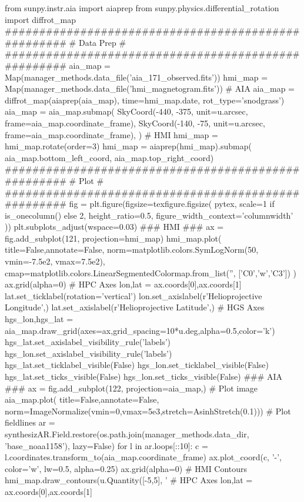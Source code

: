 \begin{pycode}
from sunpy.instr.aia import aiaprep
from sunpy.physics.differential_rotation import diffrot_map
####################################################
#                     Data Prep                    #
####################################################
aia_map = Map(manager_methods.data_file('aia_171_observed.fits'))
hmi_map = Map(manager_methods.data_file('hmi_magnetogram.fits'))
# AIA
aia_map = diffrot_map(aiaprep(aia_map), time=hmi_map.date, rot_type='snodgrass')
aia_map = aia_map.submap(
    SkyCoord(-440, -375, unit=u.arcsec, frame=aia_map.coordinate_frame),
    SkyCoord(-140, -75, unit=u.arcsec, frame=aia_map.coordinate_frame),
)
# HMI
hmi_map = hmi_map.rotate(order=3)
hmi_map = aiaprep(hmi_map).submap(
    aia_map.bottom_left_coord, aia_map.top_right_coord)
####################################################
#                       Plot                       #
####################################################
fig = plt.figure(figsize=texfigure.figsize(
    pytex,
    scale=1 if is_onecolumn() else 2,
    height_ratio=0.5,       
    figure_width_context='columnwidth'
))
plt.subplots_adjust(wspace=0.03)
### HMI ###
ax = fig.add_subplot(121, projection=hmi_map)
hmi_map.plot(
    title=False,annotate=False,
    norm=matplotlib.colors.SymLogNorm(50, vmin=-7.5e2, vmax=7.5e2),
    cmap=matplotlib.colors.LinearSegmentedColormap.from_list('', ['C0','w','C3'])
)
ax.grid(alpha=0)
# HPC Axes
lon,lat = ax.coords[0],ax.coords[1]
lat.set_ticklabel(rotation='vertical')
lon.set_axislabel(r'Helioprojective Longitude',)
lat.set_axislabel(r'Helioprojective Latitude',)
# HGS Axes
hgs_lon,hgs_lat = aia_map.draw_grid(axes=ax,grid_spacing=10*u.deg,alpha=0.5,color='k')
hgs_lat.set_axislabel_visibility_rule('labels')
hgs_lon.set_axislabel_visibility_rule('labels')
hgs_lat.set_ticklabel_visible(False)
hgs_lon.set_ticklabel_visible(False)
hgs_lat.set_ticks_visible(False)
hgs_lon.set_ticks_visible(False)
### AIA ###
ax = fig.add_subplot(122, projection=aia_map,)
# Plot image
aia_map.plot(
    title=False,annotate=False,
    norm=ImageNormalize(vmin=0,vmax=5e3,stretch=AsinhStretch(0.1)))
# Plot fieldlines
ar = synthesizAR.Field.restore(os.path.join(manager_methods.data_dir, 'base_noaa1158'), lazy=False)
for l in ar.loops[::10]:
    c = l.coordinates.transform_to(aia_map.coordinate_frame)
    ax.plot_coord(c, '-', color='w', lw=0.5, alpha=0.25)
ax.grid(alpha=0)
# HMI Contours
hmi_map.draw_contours(u.Quantity([-5,5], '%
# HPC Axes
lon,lat = ax.coords[0],ax.coords[1]

\end{pycode}
